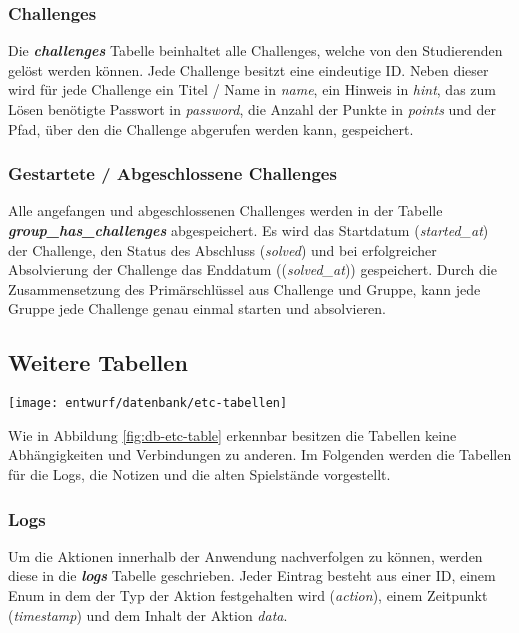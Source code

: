 \subsubsection{Challenges}
Die \textbf{\textit{challenges}} Tabelle beinhaltet alle Challenges, welche von den Studierenden gelöst werden können. Jede Challenge besitzt eine eindeutige ID. Neben dieser wird für jede Challenge ein Titel / Name in \textit{name}, ein Hinweis in \textit{hint}, das zum Lösen benötigte Passwort in \textit{password}, die Anzahl der Punkte in \textit{points} und der Pfad, über den die Challenge abgerufen werden kann, gespeichert.

\subsubsection{Gestartete / Abgeschlossene Challenges}
Alle angefangen und abgeschlossenen Challenges werden in der Tabelle \textbf{\textit{group\_has\_challenges}} abgespeichert. Es wird das Startdatum (\textit{started\_at}) der Challenge, den Status des Abschluss (\textit{solved}) und bei erfolgreicher Absolvierung der Challenge das Enddatum ((\textit{solved\_at})) gespeichert. Durch die Zusammensetzung des Primärschlüssel aus Challenge und Gruppe, kann jede Gruppe jede Challenge genau einmal starten und absolvieren.

\subsection{Weitere Tabellen}
\begin{center}
	\texttt{[image: entwurf/datenbank/etc-tabellen]}
	\label{fig:db-etc-table}
\end{center}

Wie in Abbildung \ref{fig:db-etc-table} erkennbar besitzen die Tabellen keine Abhängigkeiten und Verbindungen zu anderen. Im Folgenden werden die Tabellen für die Logs, die Notizen und die alten Spielstände vorgestellt.

\subsubsection{Logs}
Um die Aktionen innerhalb der Anwendung nachverfolgen zu können, werden diese in die \textbf{\textit{logs}} Tabelle geschrieben. Jeder Eintrag besteht aus einer ID, einem Enum in dem der Typ der Aktion festgehalten wird (\textit{action}), einem Zeitpunkt (\textit{timestamp}) und dem Inhalt der Aktion \textit{data}. 

